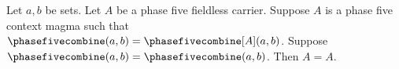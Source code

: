 

\begin{proposition}\label{notion_structure_shadow_restored}
    Let $a,b$ be sets.
    Let $A$ be a phase five fieldless carrier.
    Suppose $A$ is a phase five context magma such that
        $\phasefivecombine(a,b)=\phasefivecombine[A](a,b)$.
    Suppose $\phasefivecombine(a,b)=\phasefivecombine(a,b)$.
    Then $A=A$.
\end{proposition}
